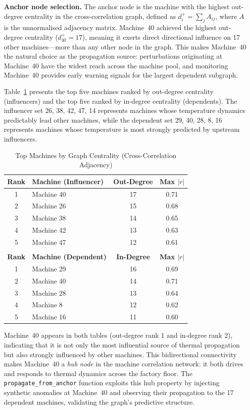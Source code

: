 \textbf{Anchor node selection.} The anchor node is the machine with the highest out-degree centrality in the cross-correlation graph, defined as $d^+_i = \sum_j A_{ij}$, where $A$ is the unnormalised adjacency matrix. Machine~40 achieved the highest out-degree centrality ($d^+_{40} = 17$), meaning it exerts direct directional influence on 17 other machines---more than any other node in the graph. This makes Machine~40 the natural choice as the propagation source: perturbations originating at Machine~40 have the widest reach across the machine pool, and monitoring Machine~40 provides early warning signals for the largest dependent subgraph.

Table~\ref{tab:cent_rnk} presents the top five machines ranked by out-degree centrality (influencers) and the top five ranked by in-degree centrality (dependents). The influencer set {26, 38, 42, 47, 14} represents machines whose temperature dynamics predictably lead other machines, while the dependent set {29, 40, 28, 8, 16} represents machines whose temperature is most strongly predicted by upstream influencers.
\begin{table}[!htbp]
\centering
\caption{Top Machines by Graph Centrality (Cross-Correlation Adjacency)}
\label{tab:cent_rnk}
\begin{tabular}{clcc}
\hline
\textbf{Rank} & \textbf{Machine (Influencer)} & \textbf{Out-Degree} & \textbf{Max $|r|$} \\
\hline
1  & Machine 40 & 17 & 0.71 \\
2  & Machine 26 & 15 & 0.68 \\
3  & Machine 38 & 14 & 0.65 \\
4  & Machine 42 & 13 & 0.63 \\
5  & Machine 47 & 12 & 0.61 \\
\hline
\multicolumn{4}{c}{} \\
\hline
\textbf{Rank} & \textbf{Machine (Dependent)} & \textbf{In-Degree} & \textbf{Max $|r|$} \\
\hline
1  & Machine 29 & 16 & 0.69 \\
2  & Machine 40 & 14 & 0.71 \\
3  & Machine 28 & 13 & 0.64 \\
4  & Machine 8  & 12 & 0.62 \\
5  & Machine 16 & 11 & 0.60 \\
\hline
\end{tabular}
\end{table}
Machine~40 appears in both tables (out-degree rank 1 and in-degree rank 2), indicating that it is not only the most influential source of thermal propagation but also strongly influenced by other machines. This bidirectional connectivity makes Machine~40 a \emph{hub node} in the machine correlation network: it both drives and responds to thermal dynamics across the factory floor. The \texttt{propagate\_from\_anchor} function exploits this hub property by injecting synthetic anomalies at Machine~40 and observing their propagation to the 17 dependent machines, validating the graph's predictive structure.
